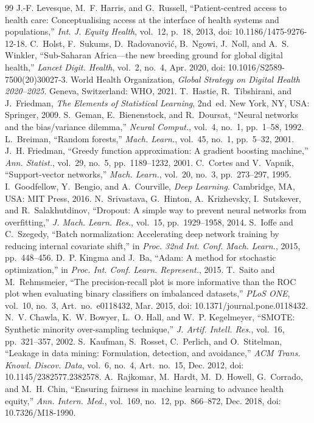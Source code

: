 \documentclass[journal]{IEEEtran}
\begin{document}
\begin{thebibliography}{99}
 J.-F. Levesque, M.~F. Harris, and G.~Russell, ``Patient-centred access to health care: Conceptualising access at the interface of health systems and populations,'' \emph{Int. J. Equity Health}, vol.~12, p.~18, 2013, doi: 10.1186/1475-9276-12-18.
 C.~Holst, F.~Sukums, D.~Radovanovi\'c, B.~Ngowi, J.~Noll, and A.~S. Winkler, ``Sub-Saharan Africa---the new breeding ground for global digital health,'' \emph{Lancet Digit. Health}, vol.~2, no.~4, Apr. 2020, doi: 10.1016/S2589-7500(20)30027-3.
 World Health Organization, \emph{Global Strategy on Digital Health 2020--2025}. Geneva, Switzerland: WHO, 2021.
 T.~Hastie, R.~Tibshirani, and J.~Friedman, \emph{The Elements of Statistical Learning}, 2nd~ed. New York, NY, USA: Springer, 2009.
 S.~Geman, E.~Bienenstock, and R.~Doursat, ``Neural networks and the bias/variance dilemma,'' \emph{Neural Comput.}, vol.~4, no.~1, pp.~1--58, 1992.
 L.~Breiman, ``Random forests,'' \emph{Mach. Learn.}, vol.~45, no.~1, pp.~5--32, 2001.
 J.~H. Friedman, ``Greedy function approximation: A gradient boosting machine,'' \emph{Ann. Statist.}, vol.~29, no.~5, pp.~1189--1232, 2001.
 C.~Cortes and V.~Vapnik, ``Support-vector networks,'' \emph{Mach. Learn.}, vol.~20, no.~3, pp.~273--297, 1995.
 I.~Goodfellow, Y.~Bengio, and A.~Courville, \emph{Deep Learning}. Cambridge, MA, USA: MIT Press, 2016.
 N.~Srivastava, G.~Hinton, A.~Krizhevsky, I.~Sutskever, and R.~Salakhutdinov, ``Dropout: A simple way to prevent neural networks from overfitting,'' \emph{J. Mach. Learn. Res.}, vol.~15, pp.~1929--1958, 2014.
 S.~Ioffe and C.~Szegedy, ``Batch normalization: Accelerating deep network training by reducing internal covariate shift,'' in \emph{Proc. 32nd Int. Conf. Mach. Learn.}, 2015, pp.~448--456.
 D.~P. Kingma and J.~Ba, ``Adam: A method for stochastic optimization,'' in \emph{Proc. Int. Conf. Learn. Represent.}, 2015.
 T.~Saito and M.~Rehmsmeier, ``The precision-recall plot is more informative than the ROC plot when evaluating binary classifiers on imbalanced datasets,'' \emph{PLoS ONE}, vol.~10, no.~3, Art.~no.~e0118432, Mar. 2015, doi: 10.1371/journal.pone.0118432.
 N.~V. Chawla, K.~W. Bowyer, L.~O. Hall, and W.~P. Kegelmeyer, ``SMOTE: Synthetic minority over-sampling technique,'' \emph{J. Artif. Intell. Res.}, vol.~16, pp.~321--357, 2002.
 S.~Kaufman, S.~Rosset, C.~Perlich, and O.~Stitelman, ``Leakage in data mining: Formulation, detection, and avoidance,'' \emph{ACM Trans. Knowl. Discov. Data}, vol.~6, no.~4, Art.~no.~15, Dec. 2012, doi: 10.1145/2382577.2382578.
 A.~Rajkomar, M.~Hardt, M.~D. Howell, G.~Corrado, and M.~H. Chin, ``Ensuring fairness in machine learning to advance health equity,'' \emph{Ann. Intern. Med.}, vol.~169, no.~12, pp.~866--872, Dec. 2018, doi: 10.7326/M18-1990.
\end{thebibliography}
\end{document}
